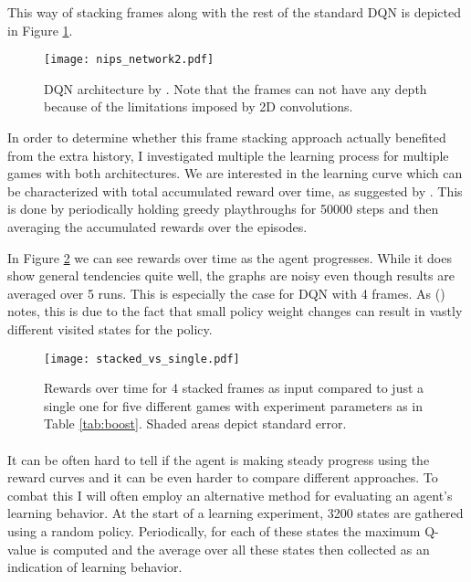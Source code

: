 This way of stacking frames along with the rest of the standard DQN
is depicted in Figure \ref{fig:nips_network2}.

\begin{figure}[htpb]
  \centering
  \texttt{[image: nips\_network2.pdf]}
  \caption{DQN architecture by \cite{Mnih2013}.
    Note that the frames can not have any depth because of
    the limitations imposed by 2D convolutions.
  }
  \label{fig:nips_network2}
\end{figure}

In order to determine
whether this frame stacking approach
actually benefited from the extra history,
I investigated multiple
the learning process for multiple games
with both architectures.
We are interested in the learning curve
which can be characterized with
total accumulated reward over time,
as suggested by \citeauthor{Bellemare2015} \citeyear{Bellemare2015}.
This is done by periodically
holding greedy playthroughs for 50000 steps
and then averaging the accumulated rewards
over the episodes.

In Figure \ref{fig:stacked_vs_single_rewards}
we can see rewards over time as the agent progresses.
While it does show general tendencies quite well,
the graphs are noisy even though results are averaged over 5 runs.
This is especially the case for DQN with 4 frames.
As \citeauthor{Mnih2013} (\citeyear{Mnih2013}) notes,
this is due to the fact that small policy weight changes
can result in vastly different visited states for the policy.



\begin{figure}[htpb]
  \centering
  \texttt{[image: stacked\_vs\_single.pdf]}
  \caption{
    Rewards over time for 4 stacked frames as input
    compared to just a single one
    for five different games
    with experiment parameters as in Table \ref{tab:boost}.
    Shaded areas depict standard error.
  }
  \label{fig:stacked_vs_single_rewards}
\end{figure}

\paragraph{}
It can be often hard to tell if the agent is making steady progress
using the reward curves
and it can be even harder to compare different approaches.
To combat this I will often employ an alternative method
for evaluating an agent's learning behavior.
At the start of a learning experiment, 3200 states are gathered
using a random policy.
Periodically,
for each of these states the maximum Q-value is computed
and the average over all these states then collected
as an indication of learning behavior.

